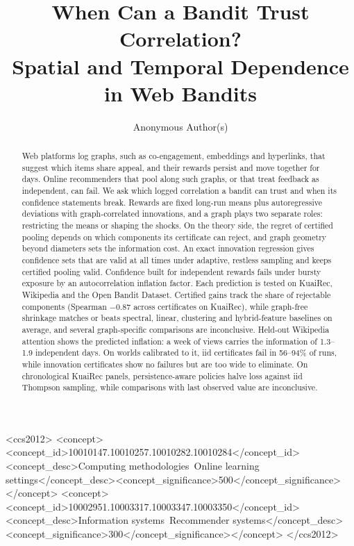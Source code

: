 \documentclass[sigconf,review,anonymous]{acmart}
\begin{document}
\title{When Can a Bandit Trust Correlation?\texorpdfstring{\\}{ }Spatial and Temporal Dependence in Web Bandits}

\author{Anonymous Author(s)}

\begin{abstract}
Web platforms log graphs, such as co-engagement, embeddings and hyperlinks, that suggest which items share appeal, and their rewards persist and move together for days. Online recommenders that pool along such graphs, or that treat feedback as independent, can fail. We ask which logged correlation a bandit can trust and when its confidence statements break. Rewards are fixed long-run means plus autoregressive deviations with graph-correlated innovations, and a graph plays two separate roles: restricting the means or shaping the shocks. On the theory side, the regret of certified pooling depends on which components its certificate can reject, and graph geometry beyond diameters sets the information cost. An exact innovation regression gives confidence sets that are valid at all times under adaptive, restless sampling and keeps certified pooling valid. Confidence built for independent rewards fails under bursty exposure by an autocorrelation inflation factor. Each prediction is tested on KuaiRec, Wikipedia and the Open Bandit Dataset. Certified gains track the share of rejectable components (Spearman $-0.87$ across certificates on KuaiRec), while graph-free shrinkage matches or beats spectral, linear, clustering and hybrid-feature baselines on average, and several graph-specific comparisons are inconclusive. Held-out Wikipedia attention shows the predicted inflation: a week of views carries the information of 1.3--1.9 independent days. On worlds calibrated to it, iid certificates fail in 56--94\% of runs, while innovation certificates show no failures but are too wide to eliminate. On chronological KuaiRec panels, persistence-aware policies halve loss against iid Thompson sampling, while comparisons with last observed value are inconclusive.
\end{abstract}

\begin{CCSXML}
<ccs2012>
<concept><concept_id>10010147.10010257.10010282.10010284</concept_id>
<concept_desc>Computing methodologies~Online learning settings</concept_desc><concept_significance>500</concept_significance></concept>
<concept><concept_id>10002951.10003317.10003347.10003350</concept_id>
<concept_desc>Information systems~Recommender systems</concept_desc><concept_significance>300</concept_significance></concept>
</ccs2012>
\end{CCSXML}
\end{document}
